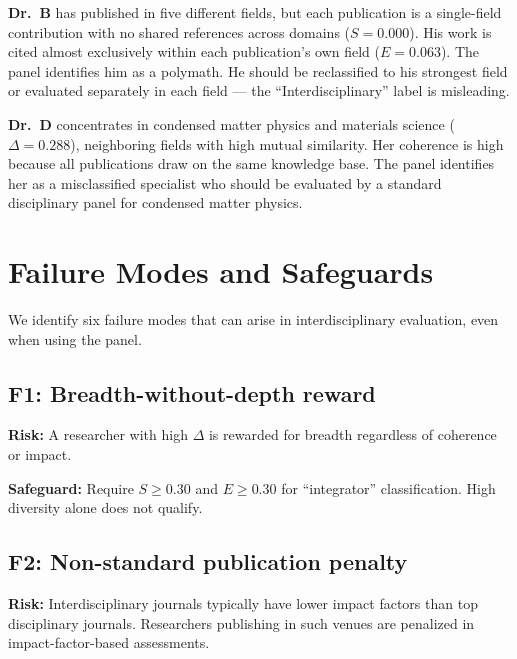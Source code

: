 \documentclass[
]{article}
\begin{document}
\textbf{Dr.~B} has published in five different fields, but each
publication is a single-field contribution with no shared references
across domains (\(S = 0.000\)). His work is cited almost exclusively
within each publication's own field (\(E = 0.063\)). The panel
identifies him as a polymath. He should be reclassified to his strongest
field or evaluated separately in each field --- the
``Interdisciplinary'' label is misleading.

\textbf{Dr.~D} concentrates in condensed matter physics and materials
science (\(\Delta = 0.288\)), neighboring fields with high mutual
similarity. Her coherence is high because all publications draw on the
same knowledge base. The panel identifies her as a misclassified
specialist who should be evaluated by a standard disciplinary panel for
condensed matter physics.

\hypertarget{failure-modes-and-safeguards}{%
\section{Failure Modes and
Safeguards}\label{failure-modes-and-safeguards}}

We identify six failure modes that can arise in interdisciplinary
evaluation, even when using the panel.

\hypertarget{f1-breadth-without-depth-reward}{%
\subsection{F1: Breadth-without-depth
reward}\label{f1-breadth-without-depth-reward}}

\textbf{Risk:} A researcher with high \(\Delta\) is rewarded for breadth
regardless of coherence or impact.

\textbf{Safeguard:} Require \(S \geq 0.30\) and \(E \geq 0.30\) for
``integrator'' classification. High diversity alone does not qualify.

\hypertarget{f2-non-standard-publication-penalty}{%
\subsection{F2: Non-standard publication
penalty}\label{f2-non-standard-publication-penalty}}

\textbf{Risk:} Interdisciplinary journals typically have lower impact
factors than top disciplinary journals. Researchers publishing in such
venues are penalized in impact-factor-based assessments.
\end{document}
